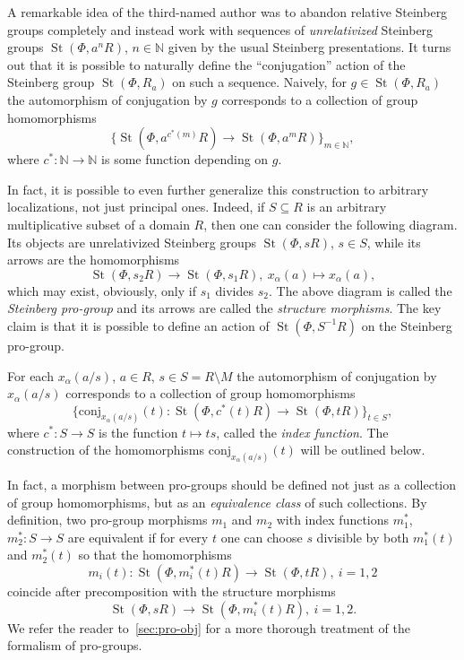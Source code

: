 \documentclass[oneside, 11pt]{amsart}
\numberwithin{equation}{section}
\theoremstyle{definition}
\theoremstyle{remark}
\DeclareMathOperator\St{St}
\begin{document}
A remarkable idea of the third-named author was to abandon relative Steinberg groups completely and instead work with sequences of {\it unrelativized} Steinberg groups $\St(\Phi, a^nR)$, $n \in \mathbb N$ given by the usual Steinberg presentations.
It turns out that it is possible to naturally define the ``conjugation'' action of the Steinberg group $\St(\Phi, R_a)$ on such a sequence. Naively, for $g \in \St(\Phi, R_a)$ the automorphism of conjugation by $g$ corresponds to a collection of group homomorphisms \[\{\St(\Phi, a^{c^*(m)}R) \to \St(\Phi, a^{m}R)\}_{m \in \mathbb N },\] where $c^*\colon \mathbb N \to \mathbb N$ is some function depending on $g$.

In fact, it is possible to even further generalize this construction to arbitrary localizations, not just principal ones.
Indeed, if $S \subseteq R$ is an arbitrary multiplicative subset of a domain $R$, then one can consider the following diagram.
Its objects are unrelativized Steinberg groups $\St(\Phi, sR)$, $s \in S$, while its arrows are the homomorphisms
\[ \St(\Phi, s_2R) \to \St(\Phi, s_1R),\ x_\alpha(a) \mapsto x_\alpha(a), \]
which may exist, obviously, only if $s_1$ divides $s_2$. 
The above diagram is called the {\it Steinberg pro-group} and its arrows are called the {\it structure morphisms}. 
The key claim is that it is possible to define an action of $\St(\Phi, S^{-1}R)$ on the Steinberg pro-group. 

For each $x_{\alpha}(a/s)$, $a\in R$, $s\in S = R\setminus M$ the automorphism of conjugation by $x_\alpha(a/s)$ corresponds to a collection of group homomorphisms \begin{equation} \label{eq:collection} \{\mathrm{conj}_{x_\alpha(a/s)}(t) \colon  \St(\Phi, c^*(t)R) \to \St(\Phi, tR)\}_{t \in S},\end{equation} where $c^*\colon S \to S$ is the function $t \mapsto ts$, called the {\it index function}. The construction of the homomorphisms $\mathrm{conj}_{x_\alpha(a/s)}(t)$ will be outlined below.

In fact, a morphism between pro-groups should be defined not just as a collection of group homomorphisms, but as an {\it equivalence class} of such collections. By definition, two pro-group morphisms $m_1$ and $m_2$ with index functions $m_1^*$,$m_2^* \colon S \to S$ are equivalent if for every $t$ one can choose $s$ divisible by both $m_1^*(t)$ and $m_2^*(t)$ so that the homomorphisms \[m_i(t) \colon \St(\Phi, m_i^*(t)R) \to \St(\Phi, tR),\ i=1,2\] coincide after precomposition with the structure morphisms \[\St(\Phi, sR) \to \St(\Phi, m^*_i(t)R),\ i=1,2.\]
We refer the reader to~\cref{sec:pro-obj} for a more thorough treatment of the formalism of pro-groups.
\end{document}
